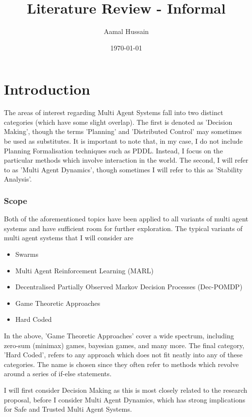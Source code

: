 \documentclass[preprint,8pt]{report}
\title{Literature Review - Informal}
\author{Aamal Hussain}
\date{\today}
\begin{document}
\maketitle
\tableofcontents

\chapter*{Introduction}



The areas of interest regarding Multi Agent Systems fall into two distinct categories (which have some slight overlap). The first is denoted as 'Decision Making', though the terms 'Planning' and 'Distributed Control' may sometimes be used as substitutes. It is important to note that, in my case, I do not include Planning Formalisation techniques such as PDDL. Instead, I focus on the particular methods which involve interaction in the world. The second, I will refer to as 'Multi Agent Dynamics', though sometimes I will refer to this as 'Stability Analysis'. 

\subsection*{Scope}

Both of the aforementioned topics have been applied to all variants of multi agent systems and have sufficient room for further exploration. The typical variants of multi agent systems that I will consider are

\begin{itemize}
    \item Swarms
    \item Multi Agent Reinforcement Learning (MARL)
    \item Decentralised Partially Observed Markov Decision Processes (Dec-POMDP)
    \item Game Theoretic Approaches
    \item Hard Coded
\end{itemize}

In the above, 'Game Theoretic Approaches' cover a wide spectrum, including zero-sum (minimax) games, bayesian games, and many more. The final category, 'Hard Coded', refers to any approach which does not fit neatly into any of these categories. The name is chosen since they often refer to methods which revolve around a series of if-else statements.

I will first consider Decision Making as this is most closely related to the research proposal, before I consider Multi Agent Dynamics, which has strong implications for Safe and Trusted Multi Agent Systems. 
\end{document}
